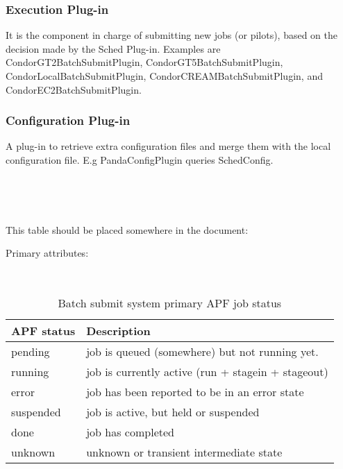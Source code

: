 \documentclass[a4paper]{jpconf}
\begin{document}
\subsubsection{Execution Plug-in} 

It is the component in charge of submitting new jobs (or pilots), 
based on the decision made by the Sched Plug-in. 
Examples are CondorGT2BatchSubmitPlugin, CondorGT5BatchSubmitPlugin, CondorLocalBatchSubmitPlugin, CondorCREAMBatchSubmitPlugin, 
and CondorEC2BatchSubmitPlugin.

\subsubsection{Configuration Plug-in} 

A plug-in to retrieve extra configuration files and merge them with the local configuration file.
E.g PandaConfigPlugin queries SchedConfig. 

~

~

This table should be placed somewhere in the document:


Primary attributes:

~

\begin{table}
   \begin{center}
      \begin{tabular}{l l}
         \hline
         \textbf{APF status} & \textbf{Description} \\ 
         \hline
         pending      &     job is queued (somewhere) but not running yet.      \\  
         running      &     job is currently active (run + stagein + stageout)  \\ 
         error        &     job has been reported to be in an error state       \\ 
         suspended    &     job is active, but held or suspended                \\ 
         done         &     job has completed                                   \\ 
         unknown      &     unknown or transient intermediate state             \\ 
         \hline
      \end{tabular}
   \end{center}
   \caption{Batch submit system primary APF job status}
   \label{job secondary status}
\end{table}
\end{document}
